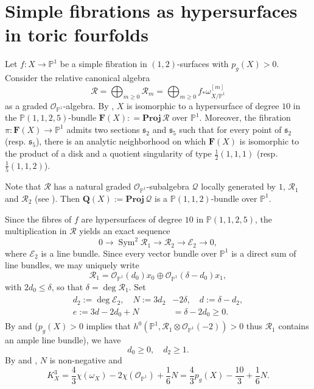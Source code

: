 \documentclass[a4paper,11pt]{amsart}
\newcommand{\PP}{\ensuremath{\mathbb{P}}}
\newcommand{\s}{\ensuremath{\mathfrak{s}}}
\DeclareMathOperator{\Sym}{Sym}
\theoremstyle{definition}
\theoremstyle{remark}
\numberwithin{equation}{section}
\begin{document}
\section{Simple fibrations as hypersurfaces in toric fourfolds} \label{section: toric 4fold}
Let $f: X \to \PP^1$ be a simple fibration in $(1,2)$-surfaces with $p_g(X) > 0$. Consider the relative canonical algebra 
$$
\mathcal{R} = \bigoplus_{m \geq 0}{\mathcal R}_m=\bigoplus_{m \geq 0} f_* \omega^{[m]}_{X/\PP^1}
$$
as a graded $\mathcal{O}_{\PP^1}$-algebra. By \cite[Theorem 4.6]{CP}, $X$ is isomorphic to a hypersurface of degree $10$ in the $\PP(1, 1, 2, 5)$-bundle $\mathbf{F}(X) : = \mathrm{\mathbf{Proj}}\, \mathcal{R}$ over $\PP^1$. Moreover, the fibration $\pi: \mathbf{F}(X) \to \PP^1$ admits two sections $\s_2$ and $\s_5$ such that for every point of $\s_2$ (resp. $\s_5$), there is an analytic neighborhood on which $\mathbf{F}(X)$ is isomorphic to the product of a disk and a quotient singularity of type $\frac{1}{2}(1, 1, 1)$ (resp. $\frac{1}{5}(1, 1, 2)$).

Note that $\mathcal{R}$ has a natural graded $\mathcal{O}_{\PP^1}$-subalgebra $\mathcal{Q}$ locally generated by $1$, $\mathcal{R}_1$ and $\mathcal{R}_2$ (see \cite[Definition 4.10]{CP}). Then $\mathbf{Q}(X) := \mathrm{\mathbf{Proj}}\, \mathcal{Q}$ is a ${\PP}(1,1,2)$-bundle over $\PP^1$. 

Since the fibres of $f$ are hypersurfaces of degree $10$ in $\PP (1,1,2,5)$, the multiplication in $\mathcal{R}$ yields an exact sequence
\begin{equation} \label{eq: multiplication exact sequence}
	0 \to \Sym^2 \mathcal{R}_1 \to \mathcal{R}_2 \to \mathcal{E}_2 \to 0,
\end{equation}
where ${\mathcal E}_2$ is a line bundle. Since every vector bundle over $\PP^1$ is a direct sum of line bundles, we may uniquely write
\begin{equation} \label{eqn: R1}
   	\mathcal{R}_1 = \mathcal{O}_{\PP^1} (d_0) x_0 \oplus \mathcal{O}_{\PP^1} (\delta - d_0) x_1,
\end{equation}
with $2d_0 \le \delta$, so that $\delta = \deg \mathcal{R}_1$. Set
\begin{gather} \label{eqn: dNd2}
\begin{split}
    d_2 := \deg \mathcal{E}_2, \quad  N := 3d_2 &- 2\delta, \quad
    d := \delta-d_2, \\ 
    e:= 3d-2d_0+N &= \delta-2d_0 \ge 0.
\end{split}
\end{gather}
By \cite[Theorem 2.7]{Fujita} and \cite[Proposition 4.6]{Viehweg2} ($p_g(X) > 0$ implies that $h^0 \left(\PP^1, \mathcal{R}_1 \otimes \mathcal{O}_{\PP^1}(-2)\right) > 0$ thus $\mathcal{R}_1$ contains an ample line bundle), we have
\begin{equation}\label{eqn: d0d2>0}
    d_0 \ge 0, \quad  d_2 \ge 1.  
\end{equation}
By \cite[Definition 4.18 and Proposition 4.21]{CP} and \cite[Lemma 3.4]{HZ}, $N$ is non-negative and 
\begin{equation} \label{eq: N}
    K^3_X = \frac43 \chi(\omega_X) - 2 \chi(\mathcal{O}_{\PP^1}) + \frac16 N = \frac{4}{3}p_g(X) - \frac{10}{3} + \frac16 N.
\end{equation}
\end{document}
